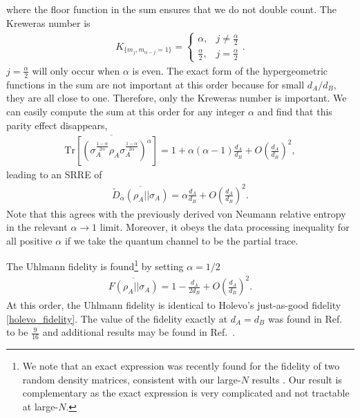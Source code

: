 \documentclass[a4paper,11pt]{article}
\newcommand{\Tr}{\text{Tr}}
\begin{document}
where the floor function in the sum ensures that we do not double count. The Kreweras number is
\begin{align}
    K_{\{m_j , m_{\alpha - j} = 1\}} = \begin{cases}
        \alpha, & j \neq \frac{\alpha}{2}
        \\
        \frac{\alpha}{2}, & j = \frac{\alpha}{2}
    \end{cases}.
\end{align}
$ j =\frac{\alpha}{2}$ will only occur when $\alpha$ is even. The exact form of the hypergeometric functions in the sum are not important at this order because for small $d_A/d_B$, they are all close to one. Therefore, only the Kreweras number is important. We can easily compute the sum at this order for any integer $\alpha$ and find that this parity effect disappears,
\begin{align}
    \overline{\Tr\left[\left( \sigma_A^{\frac{1-\alpha}{2\alpha}}
    {\rho^{\ }_A} \sigma_A^{\frac{1-\alpha}{2\alpha}}\right)^{\alpha}\right]} =
        1+ \alpha (\alpha - 1)\frac{d_A}{d_B}+O\left(\frac{d_A}{d_B}\right)^2,  
\end{align}
leading to an SRRE of
\begin{align}
    \overline{\tilde{D}_{\alpha}(\rho_A || \sigma_A)} = \alpha \frac{d_A}{d_B}+O\left(\frac{d_A}{d_B}\right)^2.
    \label{SRRE_smalldA}
\end{align}
Note that this agrees with the previously derived von Neumann relative entropy in the relevant $\alpha \rightarrow 1$ limit. Moreover, it obeys the data processing inequality for all positive $\alpha $ if we take the quantum channel to be the partial trace.

The Uhlmann fidelity is found\footnote{We note that an exact expression was recently found for the fidelity of two random density matrices, consistent with our large-$N$ results \cite{2021arXiv210502743L}. Our result is complementary as the exact expression is very complicated and not tractable at large-$N$.} by setting $\alpha = 1/2$
\begin{align}
    \overline{F(\rho_A||\sigma_A)} = 1-\frac{d_A}{2d_B} + O\left(\frac{d_A}{d_B}\right)^2.
\end{align}
At this order, the Uhlmann fidelity is identical to Holevo's just-as-good fidelity \eqref{holevo_fidelity}. The value of the fidelity exactly at $d_A = d_B$ was found in Ref.~\cite{2016PhRvA..93f2112P} to be $\frac{9}{16}$ and additional results may be found in Ref.~\cite{2005PhRvA..71c2313Z}.
\end{document}
